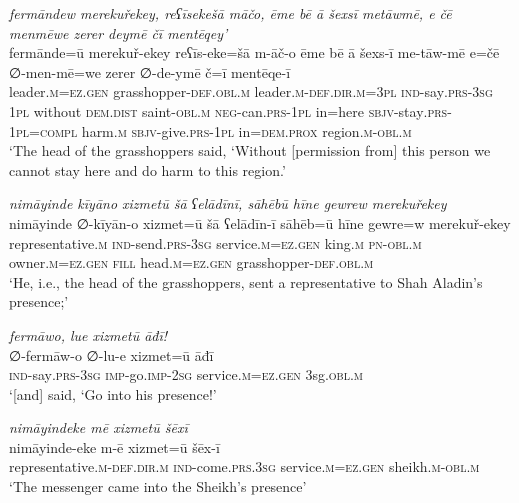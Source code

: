 \ea \label{PM.5}
\textit{fermāndew merekuřekey, reʕīsekešā māčo, ēme bē ā šexsī metāwmē, e čē menmēwe zerer deymē čī mentēqey’} \\ 
\gll fermānde=ū merekuř-ekey reʕīs-eke=šā m-āč-o ēme bē ā šexs-ī me-tāw-mē e=čē ∅-men-mē=we zerer ∅-de-ymē č=ī mentēqe-ī \\ 
 leader\textsc{.m}\textsc{\textsc{=ez.gen}} grasshopper\textsc{-def}\textsc{.obl}\textsc{.m} leader\textsc{.m}\textsc{-def}\textsc{.dir}\textsc{.m}\textsc{=3pl} \textsc{ind-}say\textsc{.prs}\textsc{-3sg} \textsc{1pl} without \textsc{dem.dist} saint\textsc{-obl}\textsc{.m} \textsc{neg-}can\textsc{.prs}\textsc{-1pl} in=here \textsc{sbjv-}stay\textsc{.prs}\textsc{-1pl}\textsc{=compl} harm\textsc{.m} \textsc{sbjv-}give\textsc{.prs}-\textsc{1pl} in=\textsc{dem.prox} region\textsc{.m}\textsc{-obl}\textsc{.m} \\ 
\glt `The head of the grasshoppers said, ‘Without [permission from] this person we cannot stay here and do harm to this region.'
\z 
 
\ea \label{PM.6}
\textit{nimāyinde kīyāno xizmetū šā ʕelādīnī, sāhēbū hīne gewrew merekuřekey} \\ 
\gll nimāyinde ∅-kīyān-o xizmet=ū šā ʕelādīn-ī sāhēb=ū hīne gewre=w merekuř-ekey \\ 
 representative\textsc{.m} \textsc{ind-}send\textsc{.prs}\textsc{-3sg} service\textsc{.m}\textsc{\textsc{=ez.gen}} king\textsc{.m} \textsc{pn}\textsc{-obl}\textsc{.m} owner\textsc{.m}\textsc{\textsc{=ez.gen}} \textsc{fill} head\textsc{.m}\textsc{\textsc{=ez.gen}} grasshopper\textsc{-def}\textsc{.obl}\textsc{.m} \\ 
\glt `He, i.e., the head of the grasshoppers, sent a representative to Shah Aladin’s presence;'
\z 
 
\ea \label{PM.8}
\textit{fermāwo, lue xizmetū āđī!} \\ 
\gll ∅-fermāw-o ∅-lu-e xizmet=ū āđī \\ 
 \textsc{ind-}say\textsc{.prs}\textsc{-3sg} \textsc{imp-}go.\textsc{imp-}\textsc{2sg} service\textsc{.m}\textsc{\textsc{=ez.gen}} 3sg\textsc{.obl}\textsc{.m} \\ 
\glt `[and] said, ‘Go into his presence!'
\z 
 
\ea \label{PM.10}
\textit{nimāyindeke mē xizmetū šēxī} \\ 
\gll nimāyinde-eke m-ē xizmet=ū šēx-ī \\ 
 representative\textsc{.m}\textsc{-def}\textsc{.dir}\textsc{.m} \textsc{ind-}come\textsc{.prs}\textsc{.3sg} service\textsc{.m}\textsc{\textsc{=ez.gen}} sheikh\textsc{.m}\textsc{-obl}\textsc{.m} \\ 
\glt `The messenger came into the Sheikh’s presence'
\z 
 
